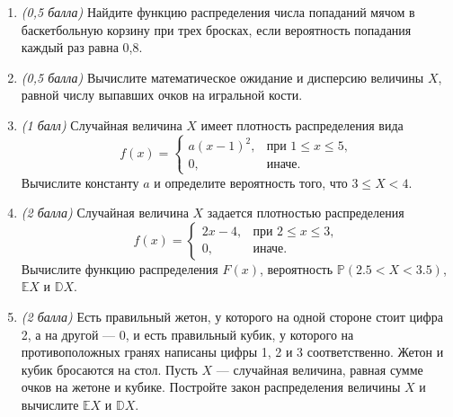 \documentclass{article}
\begin{document}
\begin{enumerate}

\item \textit{(0,5 балла)} Найдите функцию распределения числа попаданий мячом в баскетбольную корзину при трех бросках, если вероятность попадания каждый раз равна 0,8. 

\item \textit{(0,5 балла)} Вычислите математическое ожидание и дисперсию величины $X$, равной числу выпавших очков на игральной кости.

\item \textit{(1 балл)} Случайная величина $X$ имеет плотность распределения вида
$$f(x)=
\begin{cases}
   a(x-1)^2, &\text{при } 1\leq x\leq5,\\
   0, &\text{иначе}.
 \end{cases}$$
Вычислите константу $a$ и определите вероятность того, что $3\leq X<4$.

\item \textit{(2 балла)} Случайная величина $X$ задается плотностью распределения
$$f(x)=
\begin{cases}
   2x-4, &\text{при } 2\leq x\leq3,\\
   0, &\text{иначе}.
 \end{cases}$$
Вычислите функцию распределения $F(x)$, вероятность $\mathbb{P}(2.5<X<3.5)$, $\mathbb{E}X$ и $\mathbb{D}X$.

\item \textit{(2 балла)} Есть правильный жетон, у которого на одной стороне стоит цифра 2, а на другой --- 0, и есть правильный кубик, у которого на противоположных гранях написаны цифры 1, 2 и 3 соответственно. Жетон и кубик бросаются на стол. Пусть $X$ --- случайная величина, равная сумме очков на жетоне и кубике. Постройте закон распределения величины $X$ и вычислите $\mathbb{E}X$ и $\mathbb{D}X$.



\end{enumerate}
\end{document}
